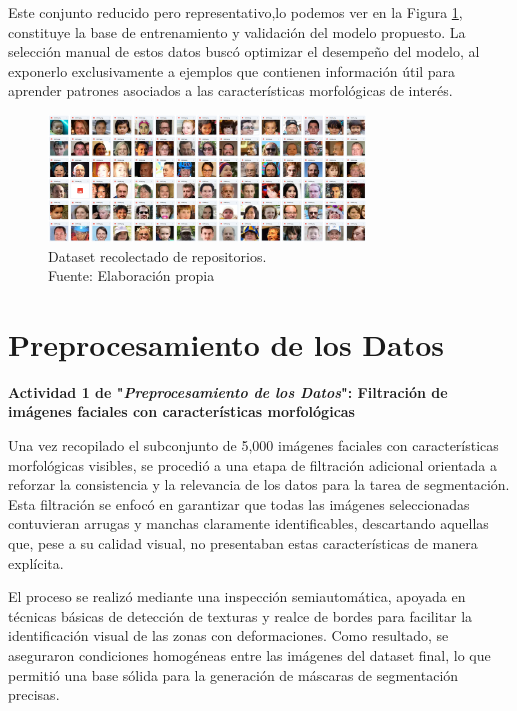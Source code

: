 Este conjunto reducido pero representativo,lo podemos ver en la Figura \ref{4:fig1}, constituye la base de entrenamiento y validación del modelo propuesto. La selección manual de estos datos buscó optimizar el desempeño del modelo, al exponerlo exclusivamente a ejemplos que contienen información útil para aprender patrones asociados a las características morfológicas de interés.

\begin{figure}[h]
	\begin{center}
		\includegraphics[width=0.75\textwidth]{4/figures/data.png}
		\caption[Dataset recolectado de repositorios]{Dataset recolectado de repositorios.\\
		Fuente: Elaboración propia}
		\label{4:fig1}
	\end{center}
\end{figure}

\section{Preprocesamiento de los Datos}

\textbf{Actividad 1 de "\textit{Preprocesamiento de los Datos}": Filtración de imágenes faciales con características morfológicas}

Una vez recopilado el subconjunto de 5,000 imágenes faciales con características morfológicas visibles, se procedió a una etapa de filtración adicional orientada a reforzar la consistencia y la relevancia de los datos para la tarea de segmentación. Esta filtración se enfocó en garantizar que todas las imágenes seleccionadas contuvieran arrugas y manchas claramente identificables, descartando aquellas que, pese a su calidad visual, no presentaban estas características de manera explícita.

El proceso se realizó mediante una inspección semiautomática, apoyada en técnicas básicas de detección de texturas y realce de bordes para facilitar la identificación visual de las zonas con deformaciones. Como resultado, se aseguraron condiciones homogéneas entre las imágenes del dataset final, lo que permitió una base sólida para la generación de máscaras de segmentación precisas.

